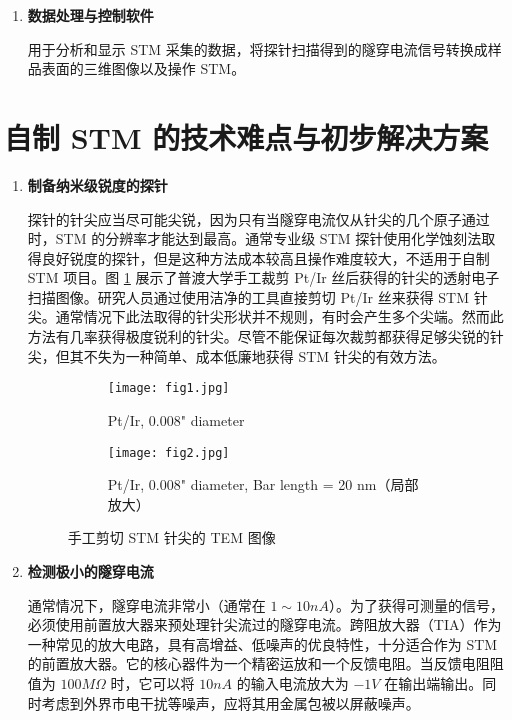 \documentclass{article}
\begin{document}
\begin{spacing}{1.625}
\begin{enumerate}
		\item \textbf{数据处理与控制软件}\par
		\qquad 用于分析和显示 STM 采集的数据，将探针扫描得到的隧穿电流信号转换成样品表面的三维图像以及操作 STM。
		
	\end{enumerate}
	
	
	
	
	
	
	
	
	
	
	\clearpage
	\section{自制 STM 的技术难点与初步解决方案}
	
	\begin{enumerate}
		\item \textbf{制备纳米级锐度的探针}\par
		\qquad 探针的针尖应当尽可能尖锐，因为只有当隧穿电流仅从针尖的几个原子通过时，STM 的分辨率才能达到最高。通常专业级 STM 探针使用化学蚀刻法取得良好锐度的探针，但是这种方法成本较高且操作难度较大，不适用于自制 STM 项目。图 \ref{fig5} 展示了普渡大学手工裁剪 Pt/Ir 丝后获得的针尖的透射电子扫描图像\cite{ref19}。研究人员通过使用洁净的工具直接剪切 Pt/Ir 丝来获得 STM 针尖。通常情况下此法取得的针尖形状并不规则，有时会产生多个尖端。然而此方法有几率获得极度锐利的针尖。尽管不能保证每次裁剪都获得足够尖锐的针尖，但其不失为一种简单、成本低廉地获得 STM 针尖的有效方法。
		
		\begin{figure}[!h]
			\centering
			\begin{subfigure}{0.35\linewidth}
				\centering
				\texttt{[image: fig1.jpg]}
				\caption{Pt/Ir, 0.008" diameter\\\quad}
			\end{subfigure}
			\hskip 1.5cm
			\begin{subfigure}{0.35\linewidth}
				\centering
				\texttt{[image: fig2.jpg]}
				\caption{Pt/Ir, 0.008" diameter, Bar length = 20 nm（局部放大）}
			\end{subfigure}
			\caption{手工剪切 STM 针尖的 TEM 图像}
			\label{fig5}
		\end{figure}
		
		
		
		\item \textbf{检测极小的隧穿电流}\par
		\qquad 通常情况下，隧穿电流非常小（通常在 $1\sim10nA$）。为了获得可测量的信号，必须使用前置放大器来预处理针尖流过的隧穿电流。跨阻放大器（TIA）作为一种常见的放大电路，具有高增益、低噪声的优良特性，十分适合作为 STM 的前置放大器。它的核心器件为一个精密运放和一个反馈电阻。当反馈电阻阻值为 $100M\Omega$ 时，它可以将 $10nA$ 的输入电流放大为 $-1V$ 在输出端输出\cite{ref11,ref12,ref17}。同时考虑到外界市电干扰等噪声，应将其用金属包被以屏蔽噪声。
		

\end{enumerate}
\end{spacing}
\end{document}
